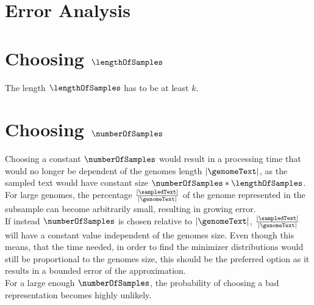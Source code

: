 \section*{Error Analysis}

\section*{Choosing $\lengthOfSamples$}
The length $\lengthOfSamples$ has to be at least $k$. 

\section*{Choosing $\numberOfSamples$}
Choosing a constant $\numberOfSamples$ would result in a processing time that would no longer be dependent of the genomes length $|\genomeText|$, as the sampled text would have constant size $\numberOfSamples * \lengthOfSamples$. For large genomes, the percentage $\frac{|\sampledText|}{|\genomeText|}$ of the genome represented in the subsample can become arbitrarily small, resulting in growing error.\\
If instead $\numberOfSamples$ is chosen relative to $|\genomeText|$, $\frac{|\sampledText|}{|\genomeText|}$ will have a constant value independent of the genomes size. Even though this means, that the time needed, in order to find the minimizer distributions would still be proportional to the genomes size, this should be the preferred option as it results in a bounded error of the approximation.
\\
For a large enough $\numberOfSamples$, the probability of choosing a bad representation becomes highly unlikely.\\